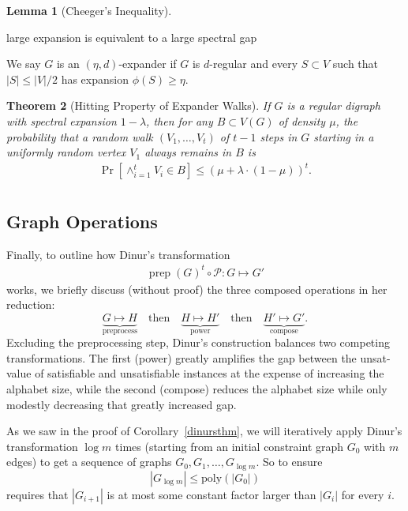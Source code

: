 \documentclass{article}
\newtheorem{theorem}{Theorem}
\newtheorem{lemma}[theorem]{Lemma}
\newcommand{\poly}{{\mathrm{poly}}}
\newcommand{\prep}{{\operatorname{prep}}}
\begin{document}
\begin{lemma}[Cheeger's Inequality]
\end{lemma}

large expansion is equivalent to a large spectral gap

We say $G$ is an $(\eta, d)$-expander if $G$ is $d$-regular and
every $S \subset V$ such that $|S| \le |V|/2$ has expansion $\phi(S) \ge \eta$.



\begin{theorem}[Hitting Property of Expander Walks]
If $G$ is a regular digraph with spectral expansion $1 - \lambda$, then for any $B \subset V(G)$
of density $\mu$, the probability that a random walk $(V_1, \dots, V_t)$ of $t - 1$
steps in $G$ starting in a uniformly random vertex $V_1$ always remains in $B$ is
\begin{align*}
\Pr\left[\wedge_{i=1}^t V_i \in B\right] \le (\mu + \lambda \cdot (1 - \mu))^t.\\
\end{align*}
\end{theorem}


\subsection{Graph Operations}

Finally, to outline how Dinur's transformation
\begin{align*}
\prep(G)^t \circ \mathcal{P} : G \mapsto G'
\end{align*}
works, we briefly discuss (without proof) the three composed operations in her reduction:
$$
\underbrace{G \mapsto H}_\text{preprocess} \quad\text{then}\quad
\underbrace{H \mapsto H'}_\text{power} \quad\text{then}\quad
\underbrace{H' \mapsto G'}_\text{compose}.
$$
Excluding the preprocessing step, Dinur's construction balances two
competing transformations.  The first (power) greatly amplifies
the gap between the unsat-value of satisfiable and unsatisfiable
instances at the expense of increasing the alphabet size,
while the second (compose) reduces the alphabet size while only
modestly decreasing that greatly increased gap.

As we saw in the proof of Corollary~\ref{dinursthm}, we will iteratively apply
Dinur's transformation $\log m$ times (starting from an initial constraint graph
$G_0$ with $m$ edges) to get a sequence of graphs $G_0, G_1, \dots, G_{\log m}$.
So to ensure
$$
|G_{\log m}| \le \poly(|G_0|)
$$
requires that $|G_{i+1}|$ is at most some constant factor larger
than $|G_i|$ for every $i$.
\end{document}
